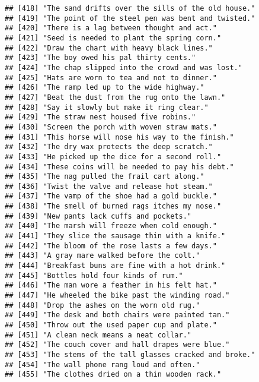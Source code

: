 \documentclass[
]{article}
\begin{document}
\begin{verbatim}
## [418] "The sand drifts over the sills of the old house."         
## [419] "The point of the steel pen was bent and twisted."         
## [420] "There is a lag between thought and act."                  
## [421] "Seed is needed to plant the spring corn."                 
## [422] "Draw the chart with heavy black lines."                   
## [423] "The boy owed his pal thirty cents."                       
## [424] "The chap slipped into the crowd and was lost."            
## [425] "Hats are worn to tea and not to dinner."                  
## [426] "The ramp led up to the wide highway."                     
## [427] "Beat the dust from the rug onto the lawn."                
## [428] "Say it slowly but make it ring clear."                    
## [429] "The straw nest housed five robins."                       
## [430] "Screen the porch with woven straw mats."                  
## [431] "This horse will nose his way to the finish."              
## [432] "The dry wax protects the deep scratch."                   
## [433] "He picked up the dice for a second roll."                 
## [434] "These coins will be needed to pay his debt."              
## [435] "The nag pulled the frail cart along."                     
## [436] "Twist the valve and release hot steam."                   
## [437] "The vamp of the shoe had a gold buckle."                  
## [438] "The smell of burned rags itches my nose."                 
## [439] "New pants lack cuffs and pockets."                        
## [440] "The marsh will freeze when cold enough."                  
## [441] "They slice the sausage thin with a knife."                
## [442] "The bloom of the rose lasts a few days."                  
## [443] "A gray mare walked before the colt."                      
## [444] "Breakfast buns are fine with a hot drink."                
## [445] "Bottles hold four kinds of rum."                          
## [446] "The man wore a feather in his felt hat."                  
## [447] "He wheeled the bike past the winding road."               
## [448] "Drop the ashes on the worn old rug."                      
## [449] "The desk and both chairs were painted tan."               
## [450] "Throw out the used paper cup and plate."                  
## [451] "A clean neck means a neat collar."                        
## [452] "The couch cover and hall drapes were blue."               
## [453] "The stems of the tall glasses cracked and broke."         
## [454] "The wall phone rang loud and often."                      
## [455] "The clothes dried on a thin wooden rack."                 

\end{verbatim}
\end{document}
